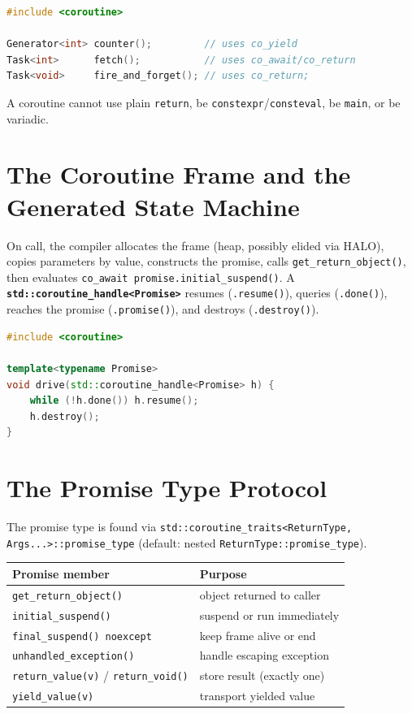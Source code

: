 \begin{lstlisting}[language=C++,caption={Each keyword makes the enclosing function a coroutine}]
#include <coroutine>

Generator<int> counter();         // uses co_yield
Task<int>      fetch();           // uses co_await/co_return
Task<void>     fire_and_forget(); // uses co_return;
\end{lstlisting}

A coroutine cannot use plain \texttt{return}, be \texttt{constexpr}/\texttt{consteval}, be \texttt{main}, or be variadic.

\section{The Coroutine Frame and the Generated State Machine}
\label{sec:c20-frame}

On call, the compiler allocates the frame (heap, possibly elided via HALO), copies parameters by value, constructs the promise, calls \texttt{get\_return\_object()}, then evaluates \texttt{co\_await promise.initial\_suspend()}. A \textbf{\texttt{std::coroutine\_handle<Promise>}} resumes (\texttt{.resume()}), queries (\texttt{.done()}), reaches the promise (\texttt{.promise()}), and destroys (\texttt{.destroy()}).

\begin{lstlisting}[language=C++,caption={coroutine\_handle drives a coroutine from non-coroutine code}]
#include <coroutine>

template<typename Promise>
void drive(std::coroutine_handle<Promise> h) {
    while (!h.done()) h.resume();
    h.destroy();
}
\end{lstlisting}

\section{The Promise Type Protocol}
\label{sec:c20-promise-protocol}

The promise type is found via \texttt{std::coroutine\_traits<ReturnType, Args...>::promise\_type} (default: nested \texttt{ReturnType::promise\_type}).

\begin{center}
\begin{tabular}{ll}
\hline
\textbf{Promise member} & \textbf{Purpose} \\
\hline
\texttt{get\_return\_object()} & object returned to caller \\
\texttt{initial\_suspend()} & suspend or run immediately \\
\texttt{final\_suspend() noexcept} & keep frame alive or end \\
\texttt{unhandled\_exception()} & handle escaping exception \\
\texttt{return\_value(v)} / \texttt{return\_void()} & store result (exactly one) \\
\texttt{yield\_value(v)} & transport yielded value \\
\hline
\end{tabular}
\end{center}

